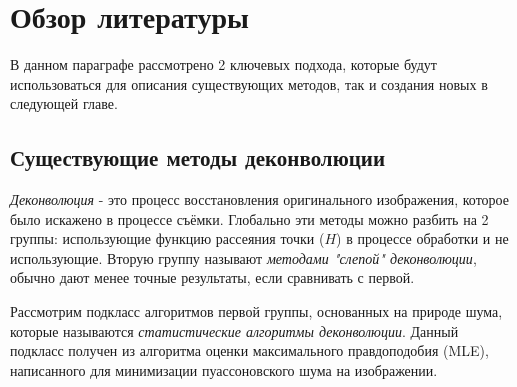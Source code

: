\section{Обзор литературы} \label{ch1:sec2}
\par В данном параграфе рассмотрено 2 ключевых подхода, которые будут использоваться для описания существующих методов, так и создания новых в следующей главе.
\subsection{Существующие методы деконволюции} 
\par \textit{Деконволюция} - это процесс восстановления оригинального изображения, которое было искажено в процессе съёмки. Глобально эти методы можно разбить на 2 группы: использующие функцию рассеяния точки ($H$) в процессе обработки и не использующие. Вторую группу называют \textit{методами "слепой" деконволюции}, обычно дают менее точные результаты, если сравнивать с первой.
\par Рассмотрим подкласс алгоритмов первой группы, основанных на природе шума, которые называются \textit{статистические алгоритмы деконволюции}. Данный подкласс получен из алгоритма оценки максимального правдоподобия (MLE), написанного для минимизации пуассоновского шума на изображении. 

